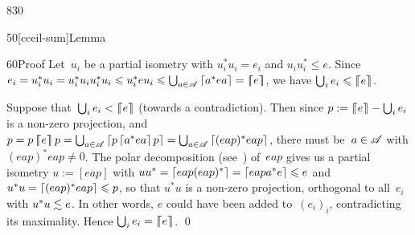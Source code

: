 \begin{parsec}{830}
\begin{point}{50}[cceil-sum]{Lemma}
\begin{point}{60}{Proof}
Let~$u_i$ be a partial isometry
with $u_i^*u_i=e_i$ and $u_iu_i^* \leq e$.
Since $e_i=u_i^* u_i = u_i^* u_i u_i^* u_i
\leqslant u_i^* e u_i 
\leqslant \bigcup_{a\in \mathscr{A}} \left\lceil a^* e a\right\rceil=\left\lceil\!\!\left\lceil e\right\rceil\!\!\right\rceil$,
we have
$\bigcup_i e_i \leqslant \left\lceil\!\!\left\lceil e\right\rceil\!\!\right\rceil$.

Suppose that~$\bigcup_i e_i < \left\lceil\!\!\left\lceil e\right\rceil\!\!\right\rceil$
(towards a contradiction).
Then since $p:=\left\lceil\!\!\left\lceil e\right\rceil\!\!\right\rceil-\bigcup_i e_i $ 
is a non-zero projection,
and~$p=p\left\lceil\!\!\left\lceil e\right\rceil\!\!\right\rceil p
=\bigcup_{a\in\mathscr{A}} \left\lceil p\left\lceil a^*ea\right\rceil p\right\rceil
= \bigcup_{a\in\mathscr{A}} \left\lceil(eap)^*eap\right\rceil$,
there must be~$a\in\mathscr{A}$ with $(eap)^*eap\neq 0$.
The polar decomposition (see~)
of~$eap$
gives us a partial isometry $u:=[eap]$
with $uu^* = \left\lceil eap(eap)^*\right\rceil=\left\lceil eapa^*e\right\rceil\leqslant e$
and $u^*u= \left\lceil(eap)^*eap\right\rceil\leqslant p$,
so that $u^*u$ is a non-zero projection,
orthogonal to all~$e_i$ with $u^*u \vmleq e$.
In other words,
$e$ could have been added to~$(e_i)_i$,
contradicting its maximality.
Hence $\bigcup_i e_i = \left\lceil\!\!\left\lceil e\right\rceil\!\!\right\rceil$.
\qed
\end{point}
\end{point}
\end{parsec}
